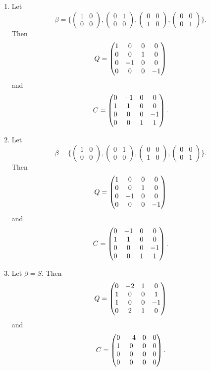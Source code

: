 \begin{enumerate}
\begin{enumerate}
\item Let 
\[\beta=\{\begin{pmatrix}1&0\\0&0\end{pmatrix},\begin{pmatrix}0&1\\0&0\end{pmatrix},\begin{pmatrix}0&0\\1&0\end{pmatrix},\begin{pmatrix}0&0\\0&1\end{pmatrix}\}.\]
Then 
\[Q=\begin{pmatrix}1 & 0 & 0 & 0\cr 0 & 0 & 1 & 0\cr 0 & -1 & 0 & 0\cr 0 & 0 & 0 & -1\end{pmatrix}\]
and 
\[C=\begin{pmatrix}0 & -1 & 0 & 0\cr 1 & 1 & 0 & 0\cr 0 & 0 & 0 & -1\cr 0 & 0 & 1 & 1\end{pmatrix}.\]
\item Let 
\[\beta=\{\begin{pmatrix}1&0\\0&0\end{pmatrix},\begin{pmatrix}0&1\\0&0\end{pmatrix},\begin{pmatrix}0&0\\1&0\end{pmatrix},\begin{pmatrix}0&0\\0&1\end{pmatrix}\}.\]
Then 
\[Q=\begin{pmatrix}1 & 0 & 0 & 0\cr 0 & 0 & 1 & 0\cr 0 & -1 & 0 & 0\cr 0 & 0 & 0 & -1\end{pmatrix}\]
and 
\[C=\begin{pmatrix}0 & -1 & 0 & 0\cr 1 & 1 & 0 & 0\cr 0 & 0 & 0 & -1\cr 0 & 0 & 1 & 1\end{pmatrix}.\]
\item Let $\beta=S$. Then 
\[Q=\begin{pmatrix}0 & -2 & 1 & 0\cr 1 & 0 & 0 & 1\cr 1 & 0 & 0 & -1\cr 0 & 2 & 1 & 0\end{pmatrix}\]
and 
\[C=\begin{pmatrix}0 & -4 & 0 & 0\cr 1 & 0 & 0 & 0\cr 0 & 0 & 0 & 0\cr 0 & 0 & 0 & 0\end{pmatrix}.\]
\end{enumerate}

\end{enumerate}
